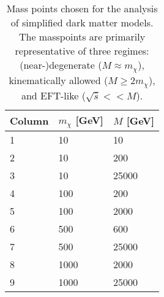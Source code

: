 \begin{flushleft}
\begin{table}[!htbp]
\centering
\begin{tabular}{l|l|l}
\hline
\hline
 \rule{0pt}{2.2ex}Column & $m_{\chi}$ [GeV] & $M$ [GeV]\\
\hline
 \rule{0pt}{2.2ex}1 & 10 & 10\\
 2 & 10 & 200\\
 3 & 10 & 25000\\
 4 & 100 & 200\\
 5 & 100 & 2000\\
 6 & 500 & 600\\
 7 & 500 & 25000\\
 8 & 1000 & 2000\\
 9 & 1000 & 25000\\
 \hline
 \hline
\end{tabular}
\caption{Mass points chosen for the analysis of simplified dark matter models. The masspoints are primarily representative of three regimes: (near-)degenerate ($M\approx m_{\chi}$), kinematically allowed ($M \geq 2m_{\chi}$), and EFT-like ($\sqrt{\hat{s}} << M$).}
\label{Mass_coup_points}
\end{table}
\end{flushleft}

